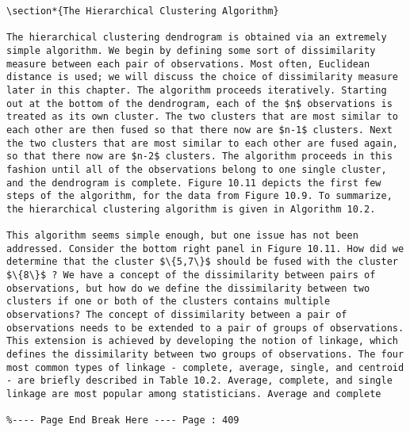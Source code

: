 \documentclass[10pt]{article}
\begin{document}
\begin{verbatim}
\section*{The Hierarchical Clustering Algorithm}

The hierarchical clustering dendrogram is obtained via an extremely simple algorithm. We begin by defining some sort of dissimilarity measure between each pair of observations. Most often, Euclidean distance is used; we will discuss the choice of dissimilarity measure later in this chapter. The algorithm proceeds iteratively. Starting out at the bottom of the dendrogram, each of the $n$ observations is treated as its own cluster. The two clusters that are most similar to each other are then fused so that there now are $n-1$ clusters. Next the two clusters that are most similar to each other are fused again, so that there now are $n-2$ clusters. The algorithm proceeds in this fashion until all of the observations belong to one single cluster, and the dendrogram is complete. Figure 10.11 depicts the first few steps of the algorithm, for the data from Figure 10.9. To summarize, the hierarchical clustering algorithm is given in Algorithm 10.2.

This algorithm seems simple enough, but one issue has not been addressed. Consider the bottom right panel in Figure 10.11. How did we determine that the cluster $\{5,7\}$ should be fused with the cluster $\{8\}$ ? We have a concept of the dissimilarity between pairs of observations, but how do we define the dissimilarity between two clusters if one or both of the clusters contains multiple observations? The concept of dissimilarity between a pair of observations needs to be extended to a pair of groups of observations. This extension is achieved by developing the notion of linkage, which defines the dissimilarity between two groups of observations. The four most common types of linkage - complete, average, single, and centroid - are briefly described in Table 10.2. Average, complete, and single linkage are most popular among statisticians. Average and complete

%---- Page End Break Here ---- Page : 409


\end{verbatim}
\end{document}
